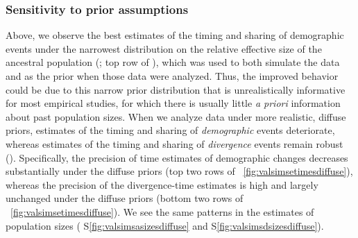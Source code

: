 \subsubsection{Sensitivity to prior assumptions}

Above, we observe the best estimates of the timing and sharing of demographic
events under the narrowest distribution on the relative effective size of the
ancestral population
(\vsimfourinc; top row of \figs
{}),
which was used to both simulate the data and as the prior
when those data were analyzed.
Thus, the improved behavior could be due to this narrow prior distribution that
is unrealistically informative for most empirical studies, for which there is
usually little \emph{a priori} information about past population sizes.
When we analyze data under more realistic, diffuse priors, estimates of the
timing and sharing of \emph{demographic} events deteriorate,
whereas estimates of the timing and sharing of \emph{divergence} events remain
robust
(\figs {}).
Specifically, the precision of time estimates of demographic changes decreases
substantially under the diffuse priors
(top two rows of \fig{}~\ref{fig:valsimsetimesdiffuse}),
whereas the precision of the divergence-time estimates
is high and largely unchanged under the diffuse priors
(bottom two rows of \fig{}~\ref{fig:valsimsetimesdiffuse}).
We see the same patterns in the estimates of population sizes
(\figs
S\ref{fig:valsimsasizesdiffuse}
and
S\ref{fig:valsimsdsizesdiffuse}).


